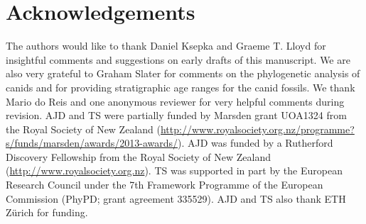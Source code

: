 \documentclass[11pt]{article}
\begin{document}
\section*{Acknowledgements}

The authors would like to thank Daniel Ksepka and Graeme T. Lloyd for insightful comments and suggestions on early drafts of this manuscript. %
We are also very grateful to Graham Slater for comments on the phylogenetic analysis of canids and for providing stratigraphic age ranges for the canid fossils. We thank Mario do Reis and one anonymous reviewer for very helpful comments during revision.
AJD and TS were partially funded by Marsden grant UOA1324 from the Royal Society of New Zealand (\url{http://www.royalsociety.org.nz/programme?s/funds/marsden/awards/2013-awards/}). AJD was funded by a Rutherford Discovery Fellowship from the Royal Society of New Zealand (\url{http://www.royalsociety.org.nz}).  TS was supported in part by the European Research Council under the 7th Framework Programme of the European Commission (PhyPD; grant agreement 335529). AJD and TS also thank ETH Z\"{u}rich for funding.




\end{document}
